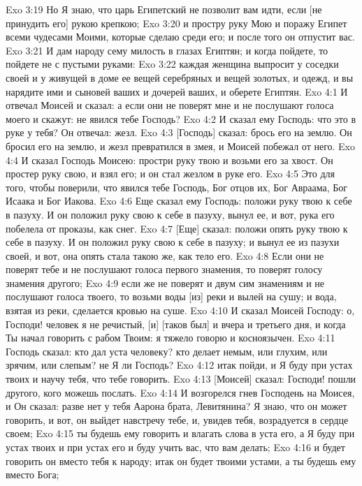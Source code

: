 Exo 3:19  Но Я знаю, что царь Египетский не позволит вам идти, если [не принудить его] рукою крепкою;
Exo 3:20  и простру руку Мою и поражу Египет всеми чудесами Моими, которые сделаю среди его; и после того он отпустит вас.
Exo 3:21  И дам народу сему милость в глазах Египтян; и когда пойдете, то пойдете не с пустыми руками:
Exo 3:22  каждая женщина выпросит у соседки своей и у живущей в доме ее вещей серебряных и вещей золотых, и одежд, и вы нарядите ими и сыновей ваших и дочерей ваших, и оберете Египтян.
Exo 4:1  И отвечал Моисей и сказал: а если они не поверят мне и не послушают голоса моего и скажут: не явился тебе Господь?
Exo 4:2  И сказал ему Господь: что это в руке у тебя? Он отвечал: жезл.
Exo 4:3  [Господь] сказал: брось его на землю. Он бросил его на землю, и жезл превратился в змея, и Моисей побежал от него.
Exo 4:4  И сказал Господь Моисею: простри руку твою и возьми его за хвост. Он простер руку свою, и взял его; и он стал жезлом в руке его.
Exo 4:5  Это для того, чтобы поверили, что явился тебе Господь, Бог отцов их, Бог Авраама, Бог Исаака и Бог Иакова.
Exo 4:6  Еще сказал ему Господь: положи руку твою к себе в пазуху. И он положил руку свою к себе в пазуху, вынул ее, и вот, рука его побелела от проказы, как снег.
Exo 4:7  [Еще] сказал: положи опять руку твою к себе в пазуху. И он положил руку свою к себе в пазуху; и вынул ее из пазухи своей, и вот, она опять стала такою же, как тело его.
Exo 4:8  Если они не поверят тебе и не послушают голоса первого знамения, то поверят голосу знамения другого;
Exo 4:9  если же не поверят и двум сим знамениям и не послушают голоса твоего, то возьми воды [из] реки и вылей на сушу; и вода, взятая из реки, сделается кровью на суше.
Exo 4:10  И сказал Моисей Господу: о, Господи! человек я не речистый, [и] [таков был] и вчера и третьего дня, и когда Ты начал говорить с рабом Твоим: я тяжело говорю и косноязычен.
Exo 4:11  Господь сказал: кто дал уста человеку? кто делает немым, или глухим, или зрячим, или слепым? не Я ли Господь?
Exo 4:12  итак пойди, и Я буду при устах твоих и научу тебя, что тебе говорить.
Exo 4:13  [Моисей] сказал: Господи! пошли другого, кого можешь послать.
Exo 4:14  И возгорелся гнев Господень на Моисея, и Он сказал: разве нет у тебя Аарона брата, Левитянина? Я знаю, что он может говорить, и вот, он выйдет навстречу тебе, и, увидев тебя, возрадуется в сердце своем;
Exo 4:15  ты будешь ему говорить и влагать слова в уста его, а Я буду при устах твоих и при устах его и буду учить вас, что вам делать;
Exo 4:16  и будет говорить он вместо тебя к народу; итак он будет твоими устами, а ты будешь ему вместо Бога;
